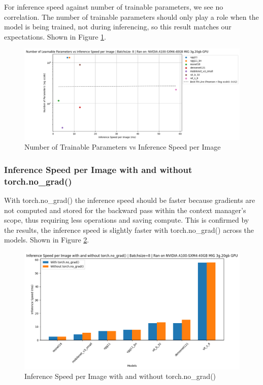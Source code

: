 \documentclass[a4paper]{article}
\begin{document}
For inference speed against number of trainable parameters, we see no correlation. The number of trainable parameters
should only play a role when the model is being trained, not during inferencing, so this result matches our
expectations. Shown in Figure \ref{fig:NumParams-vs-Inference}.
\begin{figure}[h]
    \centering
    \includegraphics[width=0.75\linewidth]{"imgs/NumParams-vs-Inference.png"}
    \caption{Number of Trainable Parameters vs Inference Speed per Image}
    \label{fig:NumParams-vs-Inference}
\end{figure}

\subsubsection{Inference Speed per Image with and without torch.no\_grad()}
With torch.no\_grad() the inference speed should be faster because gradients are not computed and stored for the
backward pass within the context manager's scope, thus requiring less operations and saving compute. This is
confirmed by the results, the inference speed is slightly faster with torch.no\_grad() across the models. Shown in
Figure \ref{fig:Inference-vs-noGrad}.
\begin{figure}[h]
    \centering
    \includegraphics[width=0.75\linewidth]{"imgs/Inference-vs-noGrad.png"}
    \caption{Inference Speed per Image with and without torch.no\_grad()}
    \label{fig:Inference-vs-noGrad}
\end{figure}
\end{document}
